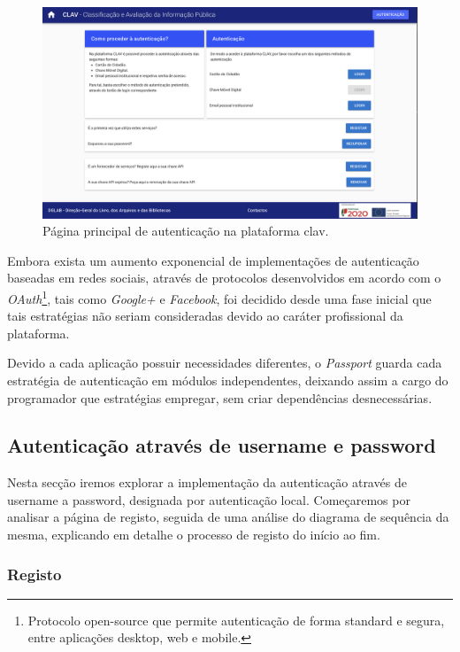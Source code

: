 \begin{figure}[h!]
    \centering
    \includegraphics[width=\textwidth]{img/clav/paginaAuth.png}
    \caption{Página principal de autenticação na plataforma \gls{clav}.}
    \label{fig:paginaAutenticacao}
\end{figure}

Embora exista um aumento exponencial de implementações de autenticação baseadas em redes sociais, através de protocolos desenvolvidos em acordo com o \emph{OAuth}\footnote{Protocolo open-source que permite autenticação de forma standard e segura, entre aplicações desktop, web e mobile.}, tais como \emph{Google+} e \emph{Facebook}, foi decidido desde uma fase inicial que tais estratégias não seriam consideradas devido ao caráter profissional da plataforma.

Devido a cada aplicação possuir necessidades diferentes, o \emph{Passport} guarda cada estratégia de autenticação em módulos independentes, deixando assim a cargo do programador que estratégias empregar, sem criar dependências desnecessárias.

\subsection{Autenticação através de username e password}

Nesta secção iremos explorar a implementação da autenticação através de username a password, designada por autenticação local. Começaremos por analisar a página de registo, seguida de uma análise do diagrama de sequência da mesma, explicando em detalhe o processo de registo do início ao fim.

\subsubsection{Registo}

